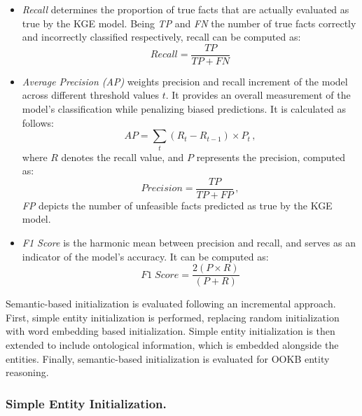 \begin{itemize}
    \item \textit{Recall} determines the proportion of true facts that are actually evaluated as true by the KGE model. Being \textit{TP} and \textit{FN} the number of true facts correctly and incorrectly classified respectively, recall can be computed as:
    \begin{equation}
        Recall = \frac{TP}{TP+FN}
    \end{equation}
    
    \item \textit{Average Precision (AP)} weights precision and recall increment of the model across different threshold values $t$. It provides an overall measurement of the model's classification while penalizing biased predictions. It is calculated as follows:
    \begin{equation}
        AP = \sum_{t} (R_t - R_{t-1}) \times P_t \,,
    \end{equation}
    where $R$ denotes the recall value, and $P$ represents the precision, computed as:
    \begin{equation}
        Precision = \frac{TP}{TP+FP} \,,
    \end{equation}
    \textit{FP} depicts the number of unfeasible facts predicted as true by the KGE model.
    
    \item \textit{F1 Score} is the harmonic mean between precision and recall, and serves as an indicator of the model's accuracy. It can be computed as:
    \begin{equation}
        F1 \; Score = \frac{2 (P \times R)}{(P + R)}
    \end{equation}
\end{itemize}

Semantic-based initialization is evaluated following an incremental approach. First, simple entity initialization is performed, replacing random initialization with word embedding based initialization. Simple entity initialization is then extended to include ontological information, which is embedded alongside the entities. Finally, semantic-based initialization is evaluated for OOKB entity reasoning.

\subsubsection{Simple Entity Initialization.}

